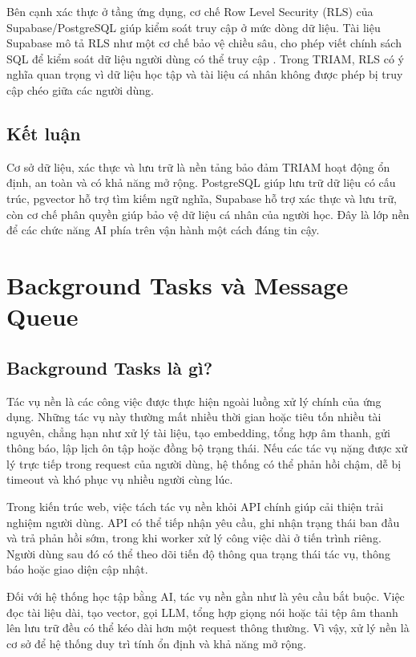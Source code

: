 \documentclass[12pt,a4paper]{report}
\begin{document}
Bên cạnh xác thực ở tầng ứng dụng, cơ chế Row Level Security (RLS) của Supabase/PostgreSQL giúp kiểm soát truy cập ở mức dòng dữ liệu. Tài liệu Supabase mô tả RLS như một cơ chế bảo vệ chiều sâu, cho phép viết chính sách SQL để kiểm soát dữ liệu người dùng có thể truy cập \cite{supabaseRlsDocs}. Trong TRIAM, RLS có ý nghĩa quan trọng vì dữ liệu học tập và tài liệu cá nhân không được phép bị truy cập chéo giữa các người dùng.

\subsection{Kết luận}

Cơ sở dữ liệu, xác thực và lưu trữ là nền tảng bảo đảm TRIAM hoạt động ổn định, an toàn và có khả năng mở rộng. PostgreSQL giúp lưu trữ dữ liệu có cấu trúc, pgvector hỗ trợ tìm kiếm ngữ nghĩa, Supabase hỗ trợ xác thực và lưu trữ, còn cơ chế phân quyền giúp bảo vệ dữ liệu cá nhân của người học. Đây là lớp nền để các chức năng AI phía trên vận hành một cách đáng tin cậy.

\section{Background Tasks và Message Queue}

\subsection{Background Tasks là gì?}

Tác vụ nền là các công việc được thực hiện ngoài luồng xử lý chính của ứng dụng. Những tác vụ này thường mất nhiều thời gian hoặc tiêu tốn nhiều tài nguyên, chẳng hạn như xử lý tài liệu, tạo embedding, tổng hợp âm thanh, gửi thông báo, lập lịch ôn tập hoặc đồng bộ trạng thái. Nếu các tác vụ nặng được xử lý trực tiếp trong request của người dùng, hệ thống có thể phản hồi chậm, dễ bị timeout và khó phục vụ nhiều người cùng lúc.

Trong kiến trúc web, việc tách tác vụ nền khỏi API chính giúp cải thiện trải nghiệm người dùng. API có thể tiếp nhận yêu cầu, ghi nhận trạng thái ban đầu và trả phản hồi sớm, trong khi worker xử lý công việc dài ở tiến trình riêng. Người dùng sau đó có thể theo dõi tiến độ thông qua trạng thái tác vụ, thông báo hoặc giao diện cập nhật.

Đối với hệ thống học tập bằng AI, tác vụ nền gần như là yêu cầu bắt buộc. Việc đọc tài liệu dài, tạo vector, gọi LLM, tổng hợp giọng nói hoặc tải tệp âm thanh lên lưu trữ đều có thể kéo dài hơn một request thông thường. Vì vậy, xử lý nền là cơ sở để hệ thống duy trì tính ổn định và khả năng mở rộng.
\end{document}

